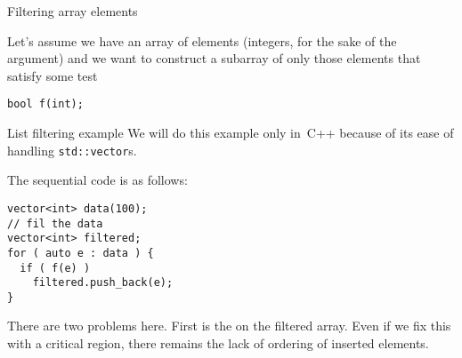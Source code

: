 

\lstset{language=C}

 {Filtering array elements}
\lstset{language=C++}


Let's assume we have an array of elements (integers, for the sake of the argument)
and we want to construct a subarray
of only those elements that satisfy some test
\begin{lstlisting}
bool f(int);
\end{lstlisting}

\begin{nopackt}
\begin{cppnote}{List filtering example}
  We will do this example only in~C++ because of its ease
  of handling \lstinline{std::vector}s.
\end{cppnote}
\end{nopackt}

The sequential code is as follows:
\begin{lstlisting}
vector<int> data(100);
// fil the data
vector<int> filtered;
for ( auto e : data ) {
  if ( f(e) )
    filtered.push_back(e);
}
\end{lstlisting}
There are two problems here.
First is the  on the filtered array.
Even if we fix this with a critical region, there remains
the lack of ordering of inserted elements.

